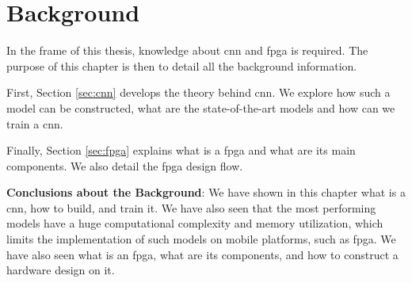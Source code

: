 \chapter{Background} \label{chap:background}
In the frame of this thesis, knowledge about \acrshort{cnn} and \acrshort{fpga} is required. The purpose of this chapter is then to detail all the background information.

First, Section \ref{sec:cnn} develops the theory behind \acrshort{cnn}. We explore how such a model can be constructed, what are the state-of-the-art models and how can we train a \acrshort{cnn}.

Finally, Section \ref{sec:fpga} explains what is a \acrshort{fpga} and what are its main components. We also detail the \acrshort{fpga} design flow.


%
\begin{tcolorbox}
    \textbf{Conclusions about the Background}: \newline \newline
    We have shown in this chapter what is a \acrshort{cnn}, how to build, and train it. We have also seen that the most performing models have a huge computational complexity and memory utilization, which limits the implementation of such models on mobile platforms, such as \acrshort{fpga}. We have also seen what is an \acrshort{fpga}, what are its components, and how to construct a hardware design on it.
\end{tcolorbox}
% 
\newpage
